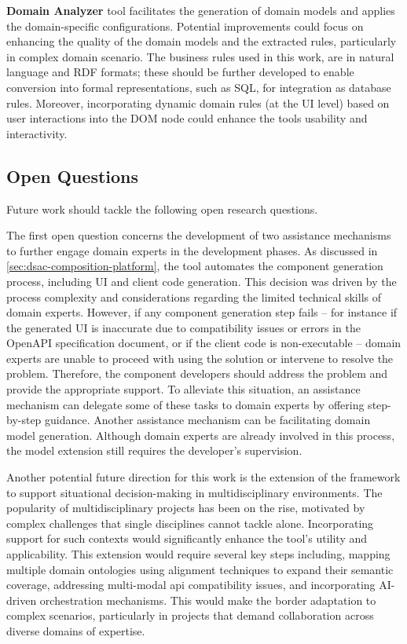 \textbf{Domain Analyzer} tool facilitates the generation of domain
models and applies the domain-specific configurations. Potential
improvements could focus on enhancing the quality of the domain models
and the extracted rules, particularly in complex domain scenario. The
business rules used in this work, are in natural language and RDF
formats; these should be further developed to enable conversion into
formal representations, such as SQL, for integration as database rules.
Moreover, incorporating dynamic domain rules (at the UI level) based on
user interactions into the DOM node could enhance the tools usability
and interactivity.

\vspace{-10pt}
\hypertarget{open-questions}{%
\subsection{Open Questions}\label{open-questions}}
\vspace{10pt}

Future work should tackle the following open research questions.

The first open question concerns the development of two assistance
mechanisms to further engage domain experts in the development phases.
As discussed in \cref{sec:dsac-composition-platform}, the tool automates the component generation
process, including UI and client code generation. This decision was
driven by the process complexity and considerations regarding the
limited technical skills of domain experts. However, if any component
generation step fails -- for instance if the generated UI is inaccurate
due to compatibility issues or errors in the OpenAPI specification
document, or if the client code is non-executable -- domain experts are
unable to proceed with using the solution or intervene to resolve the
problem. Therefore, the component developers should address the problem
and provide the appropriate support. To alleviate this situation, an
assistance mechanism can delegate some of these tasks to domain experts
by offering step-by-step guidance. Another assistance mechanism can be
facilitating domain model generation. Although domain experts are
already involved in this process, the model extension still requires the
developer's supervision.

Another potential future direction for this work is the extension of the
framework to support situational decision-making in multidisciplinary
environments. The popularity of multidisciplinary projects has been on
the rise, motivated by complex challenges that single disciplines cannot
tackle alone. Incorporating support for such contexts would
significantly enhance the tool's utility and applicability. This
extension would require several key steps including, mapping multiple
domain ontologies using alignment techniques to expand their semantic
coverage, addressing multi-modal \gls{api} compatibility issues, and
incorporating AI-driven orchestration mechanisms. This would make the
border adaptation to complex scenarios, particularly in projects that
demand collaboration across diverse domains of expertise.

